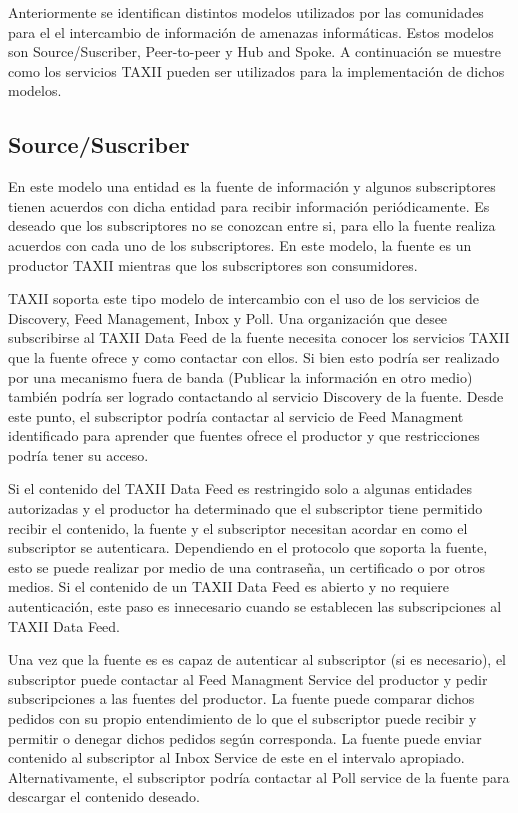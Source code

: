 Anteriormente se identifican distintos modelos utilizados por las comunidades para el 
el intercambio de información de amenazas informáticas. Estos modelos son 
Source/Suscriber, Peer-to-peer y Hub and Spoke. A continuación se  muestre como 
los servicios TAXII pueden ser utilizados para la implementación de dichos 
modelos.

\subsection{Source/Suscriber}

En este modelo una entidad es la fuente de información y algunos subscriptores 
tienen acuerdos con dicha entidad para recibir información periódicamente. Es 
deseado que los subscriptores no se conozcan entre si, para ello la fuente 
realiza acuerdos con cada uno de los subscriptores. En este modelo, la fuente es 
un productor TAXII mientras que los subscriptores son consumidores.

TAXII soporta este tipo modelo de intercambio con el uso de los servicios de 
Discovery, Feed Management, Inbox y Poll. Una organización que desee 
subscribirse al TAXII Data Feed de la fuente necesita conocer los servicios 
TAXII que la fuente ofrece y como contactar con ellos. Si bien esto podría ser 
realizado por una mecanismo fuera de banda (Publicar la información en otro medio)
también podría ser logrado contactando al servicio Discovery de la fuente. Desde 
este punto, el subscriptor podría contactar al servicio de Feed Managment 
identificado para aprender que fuentes ofrece el productor y que restricciones 
podría tener su acceso.

Si el contenido del TAXII Data Feed es restringido solo a algunas entidades 
autorizadas y el productor ha determinado que el subscriptor tiene permitido 
recibir el contenido, la fuente y el subscriptor necesitan acordar en como el 
subscriptor se autenticara. Dependiendo en el protocolo que soporta la fuente, 
esto se puede realizar por medio de una contraseña, un certificado o por otros 
medios. Si el contenido de un TAXII Data Feed es abierto y no requiere 
autenticación, este paso es innecesario cuando se establecen las subscripciones 
al TAXII Data Feed.

Una vez que la fuente es es capaz de autenticar al subscriptor (si es 
necesario), el subscriptor puede contactar al Feed Managment Service del 
productor y pedir subscripciones a las fuentes del productor. La fuente puede 
comparar dichos pedidos con su propio entendimiento de lo que el subscriptor 
puede recibir y permitir o denegar dichos pedidos según corresponda. La fuente 
puede enviar contenido al subscriptor al Inbox Service de este en el intervalo 
apropiado. Alternativamente, el subscriptor podría contactar al Poll service de 
la fuente para descargar el contenido deseado.

